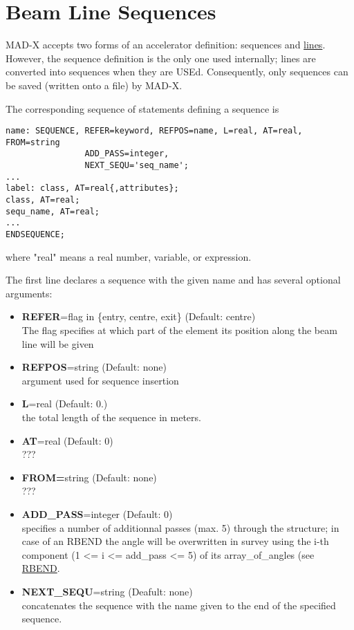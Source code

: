 
\chapter{Beam Line Sequences}
 
MAD-X accepts two forms of an accelerator definition: sequences and
\href{line.html}{lines}. However, the sequence definition is the only
one used internally; lines are converted into sequences when they are
USEd. Consequently, only sequences can be saved (written onto a file)
by MAD-X.  

The corresponding sequence of statements defining a sequence is 
\begin{verbatim}
name: SEQUENCE, REFER=keyword, REFPOS=name, L=real, AT=real, FROM=string
                ADD_PASS=integer,
                NEXT_SEQU='seq_name';
...
label: class, AT=real{,attributes}; 
class, AT=real;
sequ_name, AT=real;
...
ENDSEQUENCE;
\end{verbatim} 
where "real" means a real number, variable, or expression. 

The first line declares a sequence with the given name and has several
optional arguments:
\begin{itemize}
   \item {\bf REFER}=flag in \{entry, centre, exit\} (Default: centre) \\
     The flag specifies at which part of the element its position along
     the beam line will be given
   \item {\bf REFPOS}=string (Default: none)\\
     argument used for sequence insertion
   \item {\bf L}=real (Default: 0.)\\
     the total length of the sequence in meters. 
   \item {\bf AT}=real (Default: 0)\\
     ???
   \item {\bf FROM=}string (Default: none)\\
     ???
   \item {\bf ADD\_PASS}=integer (Default: 0)\\ 
     specifies a number of additionnal passes (max. 5) through the
     structure; in case of an RBEND the angle will be overwritten in  survey
     using the i-th component (1 \textless = i \textless = add\_pass
     \textless= 5) of its array\_of\_angles (see \href{bend.html}{RBEND}.
   \item {\bf NEXT\_SEQU}=string (Deafult: none)\\
     concatenates the sequence with the name given to the end of the
     specified sequence. 
\end{itemize}
 

